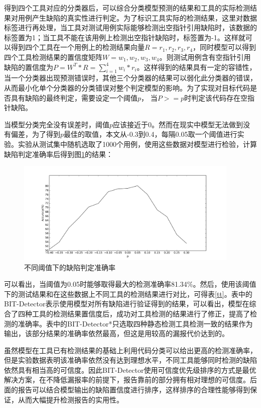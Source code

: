 得到四个工具对应的分类器后，可以综合分类模型预测的结果和工具的实际检测结果对用例产生缺陷的真实性进行判定。为了标识工具实际的检测结果，这里对数据标签进行再处理，当工具对测试用例实际能够检测出空指针引用缺陷时，该数据的标签置为1；当工具不能在该用例上检测出空指针缺陷时，标签置为-1。这样就可以得到四个工具在一个用例上的检测结果向量$R={r_1, r_2, r_3, r_4}$，同时模型可以得到四个工具检测结果的置信度矩阵$W={w_1, w_2, w_3, w_4}$。则测试用例含有空指针引用缺陷的置信度为$P = W^T*R = \sum_{i=1}^4 w_i*r_i$。这样得到的结果具有一定的容错性，当一个分类器出现预测错误时，其他三个分类器的结果可以弱化此分类器的错误，从而最小化单个分类器的分类错误对整个判定模型的影响。为了实现对目标代码是否具有缺陷的最终判定，需要设定一个阈值$p$， 当$P>=p$时判定该代码存在空指针缺陷。

当模型分类完全没有误差时，阈值$p$应该接近于0。然而在现实中模型无法做到没有偏差，为了得到$p$最佳的取值，本文从-0.3到0.4，每隔0.05取一个阈值进行实验。实验从测试集中随机选取了1000个用例，使用这些数据对模型进行检验，计算缺陷判定准确率后得到图\ref{res}的结果：
\begin{figure}[ht]
	\begin{center}
		\includegraphics[width=0.95\textwidth]{figures//10.pdf}
		\caption{不同阈值下的缺陷判定准确率}
		\label{res}
	\end{center}
\end{figure}

可以看出，当阈值为0.05时能够取得最大的检测准确率81.34\%。然后，使用该阈值下的测试结果和在这些数据上不同工具的检测结果进行对比，可得表\ref{tt}。表中的BIT-Detector表示使用模型对所有缺陷进行验证得到的结果，可以看出，模型在综合了四种工具的检测结果置信度后，成功对工具检测的结果进行了修正，提高了检测的准确率。表中的BIT-Detector*只选取四种静态检测工具检测一致的结果作为输出，该部分结果的准确率依然最高，但这是用较高的漏报代价达到的。

虽然模型在工具已有检测结果的基础上利用代码分类可以给出更高的检测准确率，但是实验数据表明该准确率依然没有达到理想水平，不同工具能够同时检测的缺陷依然具有相当高的可信度。因此BIT-Detector使用可信度优先级排序的方式是最优解决方案，在不降低漏报率的前提下，报告靠前的部分拥有相对理想的可信度。后面的报告可以结合模型输出的缺陷置信度进行排序，这样排序的合理性能够得到保证，从而大幅提升检测报告的实用性。

